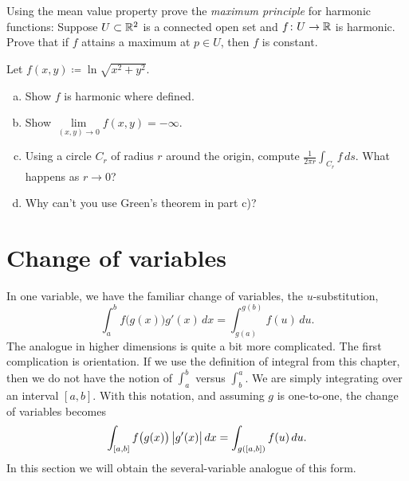 \begin{exercise}
Using the mean value property prove the
\emph{maximum principle}
for harmonic functions:
Suppose $U \subset {\mathbb{R}}^2$ is a connected open set and
$f \colon U \to {\mathbb{R}}$ is harmonic. Prove that
if $f$ attains a maximum at $p \in U$, then $f$ is constant.
\end{exercise}

\begin{exercise}
Let $f(x,y) \coloneqq \ln \sqrt{x^2+y^2}$.
\begin{enumerate}[a)]
\item
Show $f$ is harmonic where defined.
\item
Show $\lim\limits_{(x,y) \to 0} f(x,y) = -\infty$.
\item
Using a circle $C_r$ of radius
$r$ around the origin, compute $\frac{1}{2\pi r} \int_{C_r} f \, ds$.
What happens as $r \to 0$?
\item
Why can't you use Green's theorem in part c)?
\end{enumerate}
\end{exercise}



\sectionnewpage
\section{Change of variables}
\label{sec:mvchangeofvars}


In one variable, we have the familiar change of variables, the
$u$-substitution,
\begin{equation*}
\int_a^b f\bigl(g(x)\bigr) g'(x)\, dx = 
\int_{g(a)}^{g(b)} f(u) \, du .
\end{equation*}
The analogue in higher dimensions is quite
a bit more complicated.  The first complication is orientation.  If we use
the definition of integral from this chapter, then we do not have the notion
of $\int_a^b$ versus $\int_b^a$.  We are simply integrating over an
interval $[a,b]$.  With this notation, and assuming $g$ is one-to-one,
the change of variables becomes
\begin{equation*}
\int_{[a,b]} f\bigl(g(x)\bigr) \, \bigl\lvert {g'(x)} \bigr\rvert\, dx = 
\int_{g([a,b])} f(u) \, du .
\end{equation*}
In this section we will obtain the several-variable analogue of this form.

